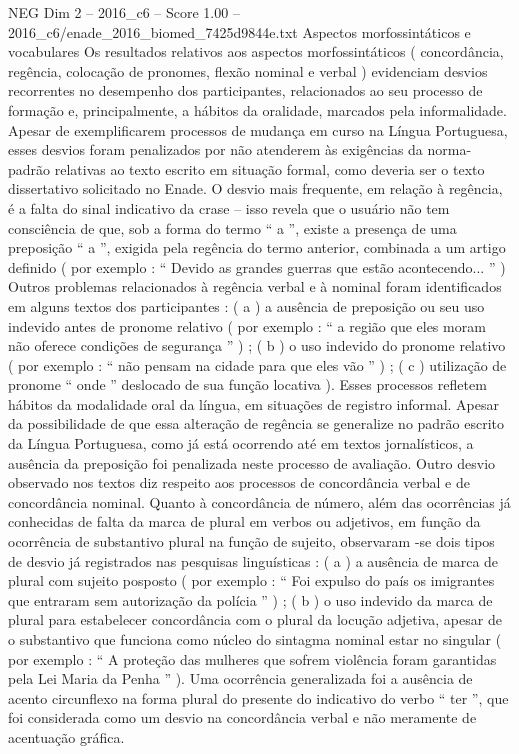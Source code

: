 \begin{textsample}{NEG Dim 2 – 2016\_c6 – Score 1.00 – 2016\_c6/enade\_2016\_biomed\_7425d9844e.txt}
Aspectos morfossintáticos e vocabulares Os resultados relativos aos aspectos morfossintáticos ( concordância, regência, colocação de pronomes, flexão nominal e verbal ) evidenciam desvios recorrentes no desempenho dos participantes, relacionados ao seu processo de formação e, principalmente, a hábitos da oralidade, marcados pela informalidade.
Apesar de exemplificarem processos de mudança em curso na Língua Portuguesa, esses desvios foram penalizados por não atenderem às exigências da norma-padrão relativas ao texto escrito em situação formal, como deveria ser o texto dissertativo solicitado no Enade.
O desvio mais frequente, em relação à regência, é a falta do sinal indicativo da crase – isso revela que o usuário não tem consciência de que, sob a forma do termo “ a ”, existe a presença de uma preposição “ a ”, exigida pela regência do termo anterior, combinada a um artigo definido ( por exemplo : “ Devido as grandes guerras que estão acontecendo... ” ) Outros problemas relacionados à regência verbal e à nominal foram identificados em alguns textos dos participantes : ( a ) a ausência de preposição ou seu uso indevido antes de pronome relativo ( por exemplo : “ a região que eles moram não oferece condições de segurança ” ) ; ( b ) o uso indevido do pronome relativo ( por exemplo : “ não pensam na cidade para que eles vão ” ) ; ( c ) utilização de pronome “ onde ” deslocado de sua função locativa ).
Esses processos refletem hábitos da modalidade oral da língua, em situações de registro informal.
Apesar da possibilidade de que essa alteração de regência se generalize no padrão escrito da Língua Portuguesa, como já está ocorrendo até em textos jornalísticos, a ausência da preposição foi penalizada neste processo de avaliação.
Outro desvio observado nos textos diz respeito aos processos de concordância verbal e de concordância nominal.
Quanto à concordância de número, além das ocorrências já conhecidas de falta da marca de plural em verbos ou adjetivos, em função da ocorrência de substantivo plural na função de sujeito, observaram -se dois tipos de desvio já registrados nas pesquisas linguísticas : ( a ) a ausência de marca de plural com sujeito posposto ( por exemplo : “ Foi expulso do país os imigrantes que entraram sem autorização da polícia ” ) ; ( b ) o uso indevido da marca de plural para estabelecer concordância com o plural da locução adjetiva, apesar de o substantivo que funciona como núcleo do sintagma nominal estar no singular ( por exemplo : “ A proteção das mulheres que sofrem violência foram garantidas pela Lei Maria da Penha ” ).
Uma ocorrência generalizada foi a ausência de acento circunflexo na forma plural do presente do indicativo do verbo “ ter ”, que foi considerada como um desvio na concordância verbal e não meramente de acentuação gráfica.

\end{textsample}
